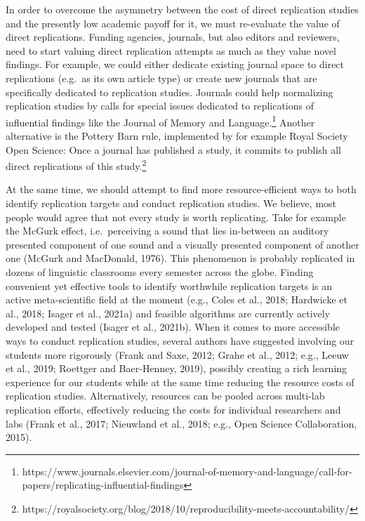 \documentclass[]{elsarticle} %
\begin{document}
In order to overcome the asymmetry between the cost of direct replication studies and the presently low academic payoff for it, we must re-evaluate the value of direct replications. Funding agencies, journals, but also editors and reviewers, need to start valuing direct replication attempts as much as they value novel findings. For example, we could either dedicate existing journal space to direct replications (e.g.~as its own article type) or create new journals that are specifically dedicated to replication studies.
Journals could help normalizing replication studies by calls for special issues dedicated to replications of influential findings like the Journal of Memory and Language.\footnote{https://www.journals.elsevier.com/journal-of-memory-and-language/call-for-papers/replicating-influential-findings}
Another alternative is the Pottery Barn rule, implemented by for example Royal Society Open Science: Once a journal has published a study, it commits to publish all direct replications of this study.\footnote{ https://royalsociety.org/blog/2018/10/reproducibility-meets-accountability/}

At the same time, we should attempt to find more resource-efficient ways to both identify replication targets and conduct replication studies. We believe, most people would agree that not every study is worth replicating. Take for example the McGurk effect, i.e.~perceiving a sound that lies in-between an auditory presented component of one sound and a visually presented component of another one (McGurk and MacDonald, 1976). This phenomenon is probably replicated in dozens of linguistic classrooms every semester across the globe. Finding convenient yet effective tools to identify worthwhile replication targets is an active meta-scientific field at the moment (e.g., Coles et al., 2018; Hardwicke et al., 2018; Isager et al., 2021a) and feasible algorithms are currently actively developed and tested (Isager et al., 2021b).
When it comes to more accessible ways to conduct replication studies, several authors have suggested involving our students more rigorously (Frank and Saxe, 2012; Grahe et al., 2012; e.g., Leeuw et al., 2019; Roettger and Baer-Henney, 2019), possibly creating a rich learning experience for our students while at the same time reducing the resource costs of replication studies. Alternatively, resources can be pooled across multi-lab replication efforts, effectively reducing the costs for individual researchers and labs (Frank et al., 2017; Nieuwland et al., 2018; e.g., Open Science Collaboration, 2015).
\end{document}
